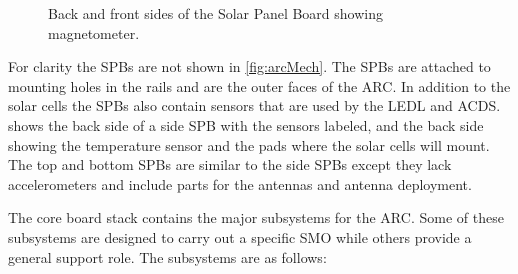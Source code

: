 \begin{figure}[!ht]
    
    \caption{Back and front sides of the Solar Panel Board showing magnetometer.}
    \label{fig:SPB}
\end{figure}

For clarity the \acp{SPB} are not shown in \cref{fig:arcMech}. The \acp{SPB} are attached to mounting holes in the rails and are the outer faces of the \ac{ARC}. In addition to the solar cells the \acp{SPB} also contain sensors that are used by the \ac{LEDL} and \ac{ACDS}.  shows the back side of a side \ac{SPB} with the sensors labeled, and the back side showing the temperature sensor and the pads where the solar cells will mount. The top and bottom \acp{SPB} are similar to the side \acp{SPB} except they lack accelerometers and include parts for the antennas and antenna deployment.

The core board stack contains the major subsystems for the \ac{ARC}. Some of these subsystems are designed to carry out a specific \ac{SMO} while others provide a general support role. The subsystems are as follows:

